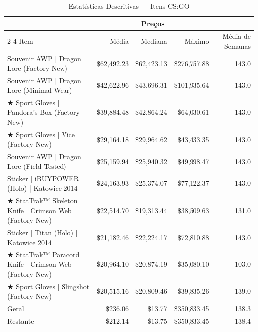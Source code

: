 \begin{table}[!t]
\caption*{
{\large Estatísticas Descritivas — Itens CS:GO}
} 

\fontsize{12.0pt}{14.4pt}\selectfont

\begin{tabular*}{\linewidth}{@{\extracolsep{\fill}}lrrrr}
\toprule
 & \multicolumn{3}{c}{Preços} &  \\ 
\cmidrule(lr){2-4}
Item & Média & Mediana & Máximo & Média de Semanas \\ 
\midrule\addlinespace[2.5pt]
Souvenir AWP | Dragon Lore (Factory New) & \$62,492.23 & \$62,423.13 & \$276,757.88 & 143.0 \\
Souvenir AWP | Dragon Lore (Minimal Wear) & \$42,622.96 & \$43,696.31 & \$101,935.64 & 143.0 \\
★ Sport Gloves | Pandora's Box (Factory New) & \$39,884.48 & \$42,864.24 & \$64,030.61 & 143.0 \\
★ Sport Gloves | Vice (Factory New) & \$29,164.18 & \$29,964.62 & \$43,433.35 & 143.0 \\
Souvenir AWP | Dragon Lore (Field-Tested) & \$25,159.94 & \$25,940.32 & \$49,998.47 & 143.0 \\
Sticker | iBUYPOWER (Holo) | Katowice 2014 & \$24,163.93 & \$25,374.07 & \$77,122.37 & 143.0 \\
★ StatTrak™ Skeleton Knife | Crimson Web (Factory New) & \$22,514.70 & \$19,313.44 & \$38,509.63 & 131.0 \\
Sticker | Titan (Holo) | Katowice 2014 & \$21,182.46 & \$22,224.17 & \$72,810.88 & 143.0 \\
★ StatTrak™ Paracord Knife | Crimson Web (Factory New) & \$20,964.10 & \$20,874.19 & \$35,080.10 & 103.0 \\
★ Sport Gloves | Slingshot (Factory New) & \$20,515.16 & \$20,809.46 & \$39,835.26 & 139.0 \\
Geral & \$236.06 & \$13.77 & \$350,833.45 & 138.3 \\
Restante & \$212.14 & \$13.75 & \$350,833.45 & 138.4 \\
\bottomrule
\end{tabular*}

\end{table}
